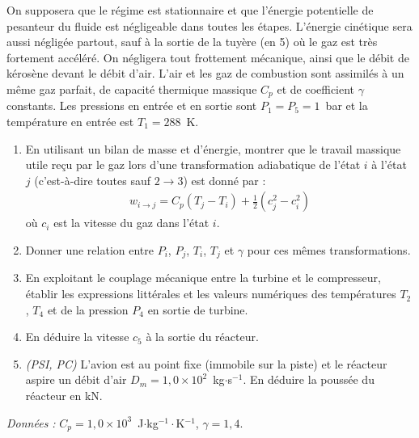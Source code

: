On supposera que le régime est stationnaire et que l'énergie potentielle de pesanteur du fluide est négligeable dans toutes les étapes. L'énergie cinétique sera aussi négligée partout, sauf à la sortie de la tuyère (en 5) où le gaz est très fortement accéléré. On négligera tout frottement mécanique, ainsi que le débit de kérosène devant le débit d'air. L'air et les gaz de combustion sont assimilés à un même gaz parfait, de capacité thermique massique $C_p$ et de coefficient $\gamma$ constants. Les pressions en entrée et en sortie sont $P_1=P_5=1$~bar et la température en entrée est $T_1=288$~K.

\begin{enumerate}

	\item En utilisant un bilan de masse et d'énergie, montrer que le travail massique utile reçu par le gaz lors d'une transformation adiabatique de l'état $i$ à l'état $j$ (c'est-à-dire toutes sauf $2\rightarrow3$) est donné par :
	\begin{align*}
		w_{i\rightarrow j}=C_p(T_j-T_i) + \frac{1}{2}\left(c_j^2-c_i^2 \right)
	\end{align*}
	où $c_i$ est la vitesse du gaz dans l'état $i$.
	\item Donner une relation entre $P_i$, $P_j$, $T_i$, $T_j$ et $\gamma$ pour ces mêmes transformations.
	\item En exploitant le couplage mécanique entre la turbine et le compresseur, établir les expressions littérales et les valeurs numériques des températures $T_2$, $T_4$ et de la pression $P_4$ en sortie de turbine.
	\item En déduire la vitesse $c_5$ à la sortie du réacteur.
	\item \textit{(PSI, PC)} L'avion est au point fixe (immobile sur la piste) et le réacteur aspire un débit d'air $D_m=1{,}0\times10^{2}$~kg$\cdot$s$^{-1}$. En déduire la poussée du réacteur en kN.

\end{enumerate}

\textit{Données :} $C_p=1{,}0\times10^3$~J$\cdot$kg$^{-1}\cdot$K$^{-1}$, $\gamma=1{,}4$.

\newpage

